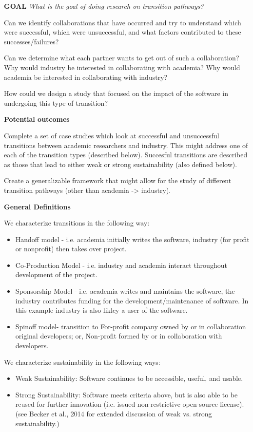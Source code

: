 \textbf{GOAL}
\emph{What is the goal of doing research on transition pathways?} 

Can we identify collaborations that have occurred and try to understand which were successful, which were unsuccessful, and what factors contributed to these successes/failures? 

Can we determine what each partner wants to get out of such a collaboration? Why would industry be interested in collaborating with academia?  Why would academia be interested in collaborating with industry?

How could we design a study that focused on the impact of the software in undergoing this type of transition?   

\textbf{Potential outcomes}

Complete a set of case studies which look at successful and unsuccessful transitions between academic researchers and industry. This might address one of each of the transition types (described below). Succesful transitions are described as those that lead to either weak or strong sustainability (also defined below). 

Create a generalizable framework that might allow for the study of different transition pathways (other than academia -> industry). 

\textbf{General Definitions}

We characterize transitions in the following way:

\begin{itemize}
\item Handoff model - i.e. academia initially writes the software, industry (for profit or nonprofit) then takes over project. 
\item Co-Production Model - i.e. industry and academia interact throughout development of the project.
\item Sponsorship Model  - i.e. academia writes and maintains the software, the industry contributes funding for the development/maintenance of software. In this example industry is also likley a user of the software.
\item Spinoff model- transition to For-profit company owned by or in collaboration original developers; or, Non-profit formed by or in collaboration with developers. 
\end{itemize}

We characterize sustainability in the following ways:

\begin{itemize}
\item Weak Sustainability: Software continues to be accessible, useful, and usable. 
\item Strong Sustainability: Software meets criteria above, but is also able to be reused for further innovation (i.e. issued non-restrictive open-source license). (see Becker et al., 2014 for extended discussion of weak vs. strong sustainability.)
\end{itemize}


